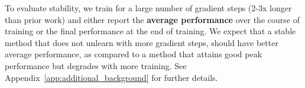 To evaluate stability, we train for a large number of gradient steps (2-3x longer than prior work) and either report the \textbf{average performance} over the course of training or the final performance at the end of training. %
We expect that a stable method that does not unlearn with more gradient steps, should have better average performance, as compared to a method that attains good peak performance but degrades with more training. See Appendix~\ref{app:additional_background} for further details.




